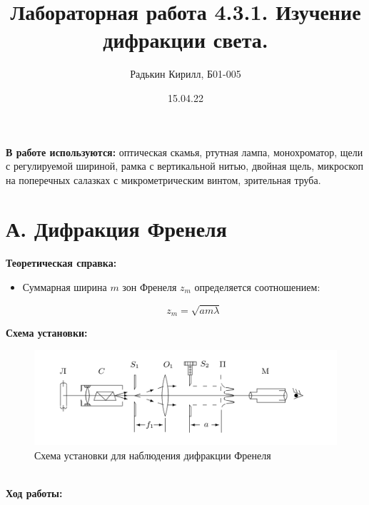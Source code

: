 \documentclass[a4paper, 12pt]{article}
\author{Радькин Кирилл, Б01-005}
\date{15.04.22}
\title{Лабораторная работа 4.3.1. Изучение дифракции света.}
\begin{document}
\maketitle
\thispagestyle{empty}
\newpage

\textbf{В работе используются:} оптическая скамья, ртутная лампа, монохроматор, щели с регулируемой шириной, рамка с вертикальной нитью, двойная щель, микроскоп на поперечных салазках с микрометрическим винтом, зрительная труба.

\section*{А. Дифракция Френеля}

\textbf{Теоретическая справка:}

\begin{itemize}
    \item Суммарная ширина $m$ зон Френеля $z_m$ определяется соотношением:
    
    \begin{equation*}
        z_m = \sqrt{a m \lambda}
    \end{equation*}
\end{itemize}

\textbf{Схема установки:}

\begin{figure}[!h]
    \centering
    \includegraphics[scale = 0.3]{pic1.png}
    \caption{Схема установки для наблюдения дифракции Френеля}
    \label{pic1}
\end{figure}

\textbf{\\Ход работы:}
\end{document}
